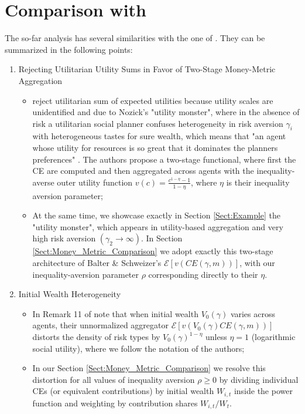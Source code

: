 \section{Comparison with \citet{BalterSchweizer2024}}
The so-far analysis has several similarities with the one of \citet{BalterSchweizer2024}. They can be summarized in the following points:
\begin{enumerate}
    \item Rejecting Utilitarian Utility Sums in Favor of Two-Stage Money-Metric Aggregation
    \begin{itemize}
        \item \citet{BalterSchweizer2024} reject \citet{Harsanyi1955} utilitarian sum of expected utilities because utility scales are unidentified and due to Nozick's "utility monster", where in the absence of risk a utilitarian social planner confuses heterogeneity in risk aversion $\gamma_i$ with heterogeneous tastes for sure wealth, which means that "an agent whose utility for resources is so great that it dominates the planners preferences" \citep{BalterSchweizer2024}. The authors propose a two-stage functional, where first the CE are computed and then aggregated across agents with the inequality-averse outer utility function $v(c) = \frac{c^{1-\eta}-1}{1-\eta}$, where $\eta$ is their inequality aversion parameter;
        \item At the same time, we showcase exactly in Section \ref{Sect:Example} the "utility monster", which appears in utility-based aggregation and very high risk aversion $(\gamma_2 \to \infty)$. In Section \ref{Sect:Money_Metric_Comparison} we adopt exactly this two-stage architecture of Balter \& Schweizer's $\mathcal{E}[v(CE(\gamma, m))]$, with our inequality-aversion parameter $\rho$ corresponding directly to their $\eta$.
    \end{itemize}
    \item Initial Wealth Heterogeneity
    \begin{itemize}
        \item In Remark 11 of \citet{BalterSchweizer2024} note that when initial wealth $V_0(\gamma)$ varies across agents, their unnormalized aggregator $\mathcal{E}[v(V_0(\gamma) CE(\gamma, m))]$ distorts the density of risk types by $V_0(\gamma)^{1-\eta}$ unless $\eta = 1$ (logarithmic social utility), where we follow the notation of the authors;
        \item In our Section \ref{Sect:Money_Metric_Comparison} we resolve this distortion for all values of inequality aversion $\rho \geq 0$ by dividing individual CEs (or equivalent contributions) by initial wealth $W_{i,t}$ inside the power function and weighting by contribution shares $W_{i,t}/W_t$.

\end{itemize}
\end{enumerate}

